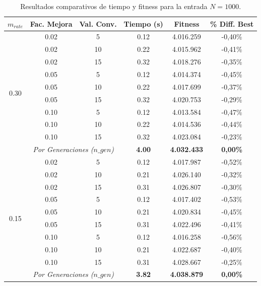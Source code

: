 \documentclass[12pt]{article}
\begin{document}
\begin{enumerate}
\begin{table}[htbp]
\centering
\caption{Resultados comparativos de tiempo y fitness para la entrada $N = 1000$.}
\label{tab:resultados_1000}
\begin{tabular}{cccccc}
\toprule
\textbf{$m_{rate}$} & \textbf{Fac. Mejora} & \textbf{Val. Conv.} & \textbf{Tiempo (s)} & \textbf{Fitness} & \textbf{\% Diff. Best} \\ 
\midrule
\multirow{10}{*}{0.30} 
 & 0.02 & 5  & 0.12 & 4.016.259 & -0,40\% \\
 & 0.02 & 10 & 0.22 & 4.015.962 & -0,41\% \\
 & 0.02 & 15 & 0.32 & 4.018.276 & -0,35\% \\
 \cmidrule(lr){2-6}
 & 0.05 & 5  & 0.12 & 4.014.374 & -0,45\% \\
 & 0.05 & 10 & 0.22 & 4.017.699 & -0,37\% \\
 & 0.05 & 15 & 0.32 & 4.020.753 & -0,29\% \\
 \cmidrule(lr){2-6}
 & 0.10 & 5  & 0.12 & 4.013.584 & -0,47\% \\
 & 0.10 & 10 & 0.22 & 4.014.536 & -0,44\% \\
 & 0.10 & 15 & 0.32 & 4.023.084 & -0,23\% \\
 \cmidrule(lr){2-6}
 & \multicolumn{2}{c}{\textit{Por Generaciones ($n\_gen$)}} & \textbf{4.00} & \textbf{4.032.433} & \textbf{0,00\%} \\
\midrule
\multirow{10}{*}{0.15} 
 & 0.02 & 5  & 0.12 & 4.017.987 & -0,52\% \\
 & 0.02 & 10 & 0.21 & 4.026.140 & -0,32\% \\
 & 0.02 & 15 & 0.31 & 4.026.807 & -0,30\% \\
 \cmidrule(lr){2-6}
 & 0.05 & 5  & 0.12 & 4.017.402 & -0,53\% \\
 & 0.05 & 10 & 0.21 & 4.020.834 & -0,45\% \\
 & 0.05 & 15 & 0.31 & 4.022.496 & -0,41\% \\
 \cmidrule(lr){2-6}
 & 0.10 & 5  & 0.12 & 4.016.258 & -0,56\% \\
 & 0.10 & 10 & 0.21 & 4.022.687 & -0,40\% \\
 & 0.10 & 15 & 0.31 & 4.028.667 & -0,25\% \\
 \cmidrule(lr){2-6}
 & \multicolumn{2}{c}{\textit{Por Generaciones ($n\_gen$)}} & \textbf{3.82} & \textbf{4.038.879} & \textbf{0,00\%} \\
\bottomrule
\end{tabular}
\end{table}


\end{enumerate}
\end{document}
